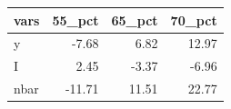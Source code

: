 \begin{tabular}{lrrr}
  \hline
vars & 55\_pct & 65\_pct & 70\_pct \\ 
  \hline
y & -7.68 & 6.82 & 12.97 \\ 
  I & 2.45 & -3.37 & -6.96 \\ 
  nbar & -11.71 & 11.51 & 22.77 \\ 
   \hline
\end{tabular}
